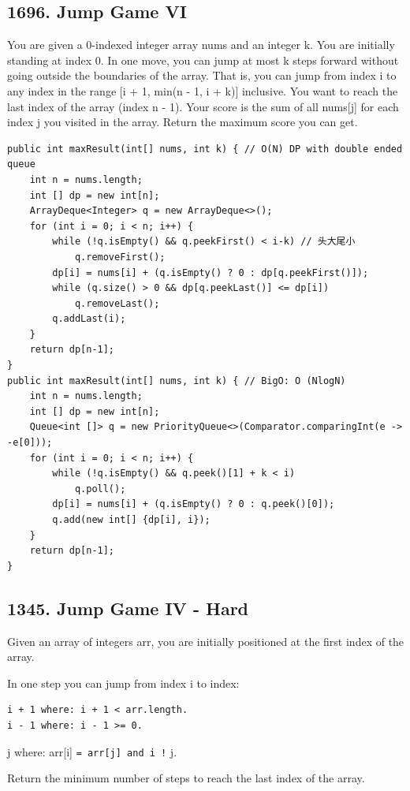 \documentclass[9pt, b5paaper]{book}
\begin{document}
\subsection{1696. Jump Game VI}
\label{sec-3-0-9}
You are given a 0-indexed integer array nums and an integer k.
You are initially standing at index 0. In one move, you can jump at most k steps forward without going outside the boundaries of the array. That is, you can jump from index i to any index in the range [i + 1, min(n - 1, i + k)] inclusive.
You want to reach the last index of the array (index n - 1). Your score is the sum of all nums[j] for each index j you visited in the array.
Return the maximum score you can get.
\begin{verbatim}
public int maxResult(int[] nums, int k) { // O(N) DP with double ended queue
    int n = nums.length;
    int [] dp = new int[n];
    ArrayDeque<Integer> q = new ArrayDeque<>();
    for (int i = 0; i < n; i++) {
        while (!q.isEmpty() && q.peekFirst() < i-k) // 头大尾小
            q.removeFirst();
        dp[i] = nums[i] + (q.isEmpty() ? 0 : dp[q.peekFirst()]);
        while (q.size() > 0 && dp[q.peekLast()] <= dp[i])
            q.removeLast();
        q.addLast(i);
    }
    return dp[n-1];
}
public int maxResult(int[] nums, int k) { // BigO: O (NlogN)
    int n = nums.length;
    int [] dp = new int[n];
    Queue<int []> q = new PriorityQueue<>(Comparator.comparingInt(e -> -e[0]));
    for (int i = 0; i < n; i++) {
        while (!q.isEmpty() && q.peek()[1] + k < i)
            q.poll();
        dp[i] = nums[i] + (q.isEmpty() ? 0 : q.peek()[0]);
        q.add(new int[] {dp[i], i});
    }
    return dp[n-1];
}
\end{verbatim}

\subsection{1345. Jump Game IV - Hard}
\label{sec-3-0-10}
Given an array of integers arr, you are initially positioned at the first index of the array.

In one step you can jump from index i to index:
\begin{verbatim}
i + 1 where: i + 1 < arr.length.
i - 1 where: i - 1 >= 0.
\end{verbatim}
j where: arr[i] \texttt{= arr[j] and i !} j.

Return the minimum number of steps to reach the last index of the array.
\end{document}

